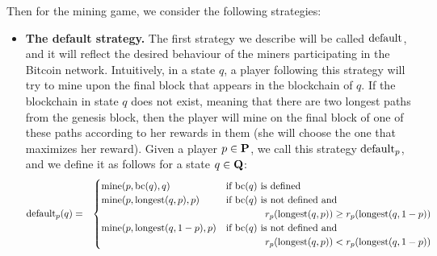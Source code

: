 Then for the mining game, we consider the following strategies:
\begin{itemize}
\item {\bf The default strategy.}  The first strategy we describe will be called $\text{\rm default}$, and it will reflect the desired behaviour of the miners participating in the Bitcoin network. Intuitively, in a state $q$, a player following this strategy will try to mine upon the final block that appears in the blockchain of $q$. If the blockchain in state $q$ does not exist, meaning that there are two longest paths from the genesis block, then the player will mine on the final block of one of these paths according to her rewards in them (she will choose the one that maximizes her reward). Given a player $p \in \mathbf{P}$, we call this strategy $\text{\rm default}_p$, and we define it as follows for a state $q \in \mathbf{Q}$:
\begin{eqnarray*}
\text{\rm default}_p(q) & = &
\begin{cases}
\text{\rm mine}(p,\text{bc}(q),q) & \text{if } \text{bc}(q) \text{ is defined}\\
\text{\rm mine}(p,{\text{\rm longest}}(q,p),p) & \text{if } \text{bc}(q) \text{ is not defined and} \\
& \hspace{40pt} r_p({\text{\rm longest}}(q,p)) \geq r_p({\text{\rm longest}}(q,1-p))\\
\text{\rm mine}(p,{\text{\rm longest}}(q,1-p),p) & \text{if } \text{bc}(q) \text{ is not defined and}\\
& \hspace{40pt} r_p({\text{\rm longest}}(q,p)) < r_p({\text{\rm longest}}(q,1-p))
\end{cases}
\end{eqnarray*}


\end{itemize}

